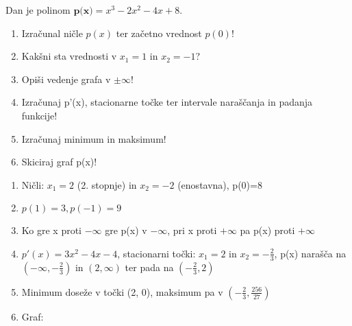 \begin{vaja}
  Dan je polinom $\textbf{p(x)}= x^3-2x^2-4x+8$.
\begin{enumerate}
\item Izračunal ničle $p(x)$ ter začetno vrednost $p(0)$!
\item Kakšni sta vrednosti v $x_1=1$ in $x_2=-1$?
\item Opiši vedenje grafa v $\pm \infty$!
\item Izračunaj p'(x), stacionarne točke ter intervale naraščanja in padanja funkcije!
\item Izračunaj minimum in maksimum!
\item Skiciraj graf p(x)!
\end{enumerate}

  \begin{odgovor}
    \begin{enumerate}
\item Ničli: $x_1=2$ (2. stopnje) in $x_2=-2$ (enostavna), p(0)=8
\item $p(1)=3, p(-1)=9$
\item Ko gre x proti $-\infty$ gre p(x) v $-\infty$, pri x proti $+\infty$ pa p(x) proti $+\infty$
\item $p'(x)=3x^2-4x-4$, stacionarni točki: $x_1=2$ in $x_2=-\frac{2}{3}$, p(x) narašča na $(-\infty, -\frac{2}{3})$  in $(2, \infty)$ ter pada na $(-\frac{2}{3}, 2)$
\item Minimum doseže v točki (2, 0), maksimum pa v $(-\frac{2}{3}, \frac{256}{27})$
\item Graf:




\end{enumerate}
\end{odgovor}
\end{vaja}
